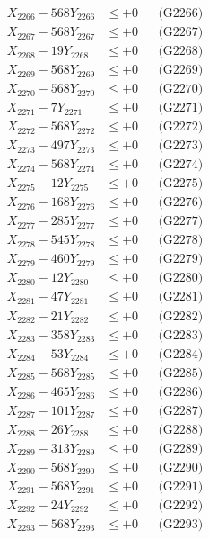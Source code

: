 \documentclass[a4paper,10pt]{article}
\begin{document}
{\begin{align}
X_{2266} - 568Y_{2266} &\leq +0 && \text{(G2266)} \\
X_{2267} - 568Y_{2267} &\leq +0 && \text{(G2267)} \\
X_{2268} - 19Y_{2268} &\leq +0 && \text{(G2268)} \\
X_{2269} - 568Y_{2269} &\leq +0 && \text{(G2269)} \\
X_{2270} - 568Y_{2270} &\leq +0 && \text{(G2270)} \\
\allowbreak
X_{2271} - 7Y_{2271} &\leq +0 && \text{(G2271)} \\
X_{2272} - 568Y_{2272} &\leq +0 && \text{(G2272)} \\
X_{2273} - 497Y_{2273} &\leq +0 && \text{(G2273)} \\
X_{2274} - 568Y_{2274} &\leq +0 && \text{(G2274)} \\
X_{2275} - 12Y_{2275} &\leq +0 && \text{(G2275)} \\
X_{2276} - 168Y_{2276} &\leq +0 && \text{(G2276)} \\
X_{2277} - 285Y_{2277} &\leq +0 && \text{(G2277)} \\
X_{2278} - 545Y_{2278} &\leq +0 && \text{(G2278)} \\
X_{2279} - 460Y_{2279} &\leq +0 && \text{(G2279)} \\
X_{2280} - 12Y_{2280} &\leq +0 && \text{(G2280)} \\
\allowbreak
X_{2281} - 47Y_{2281} &\leq +0 && \text{(G2281)} \\
X_{2282} - 21Y_{2282} &\leq +0 && \text{(G2282)} \\
X_{2283} - 358Y_{2283} &\leq +0 && \text{(G2283)} \\
X_{2284} - 53Y_{2284} &\leq +0 && \text{(G2284)} \\
X_{2285} - 568Y_{2285} &\leq +0 && \text{(G2285)} \\
X_{2286} - 465Y_{2286} &\leq +0 && \text{(G2286)} \\
X_{2287} - 101Y_{2287} &\leq +0 && \text{(G2287)} \\
X_{2288} - 26Y_{2288} &\leq +0 && \text{(G2288)} \\
X_{2289} - 313Y_{2289} &\leq +0 && \text{(G2289)} \\
X_{2290} - 568Y_{2290} &\leq +0 && \text{(G2290)} \\
\allowbreak
X_{2291} - 568Y_{2291} &\leq +0 && \text{(G2291)} \\
X_{2292} - 24Y_{2292} &\leq +0 && \text{(G2292)} \\
X_{2293} - 568Y_{2293} &\leq +0 && \text{(G2293)} \\

\end{align}}
\end{document}
